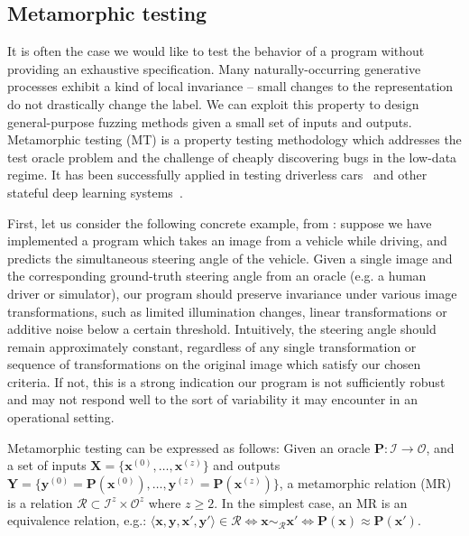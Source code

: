 \documentclass[12pt,initial,twoside,maitrise]{dms}
\numberwithin{equation}{section}
\numberwithin{table}{chapter}
\numberwithin{figure}{chapter}
\begin{document}
\subsection{Metamorphic testing}\label{subsec:metamorphic-testing}

It is often the case we would like to test the behavior of a program without providing an exhaustive specification. Many naturally-occurring generative processes exhibit a kind of local invariance -- small changes to the representation do not drastically change the label. We can exploit this property to design general-purpose fuzzing methods given a small set of inputs and outputs. Metamorphic testing (MT) is a property testing methodology which addresses the test oracle problem and the challenge of cheaply discovering bugs in the low-data regime. It has been successfully applied in testing driverless cars~\citep{zhou2019metamorphic, pei2017deepxplore, tian2018deeptest} and other stateful deep learning systems~\citep{du2018deepcruiser}.

First, let us consider the following concrete example, from \citet{tian2018deeptest}: suppose we have implemented a program which takes an image from a vehicle while driving, and predicts the simultaneous steering angle of the vehicle. Given a single image and the corresponding ground-truth steering angle from an oracle (e.g. a human driver or simulator), our program should preserve invariance under various image transformations, such as limited illumination changes, linear transformations or additive noise below a certain threshold. Intuitively, the steering angle should remain approximately constant, regardless of any single transformation or sequence of transformations on the original image which satisfy our chosen criteria. If not, this is a strong indication our program is not sufficiently robust and may not respond well to the sort of variability it may encounter in an operational setting.

Metamorphic testing can be expressed as follows: Given an oracle $\mathbf P: \mathcal I \rightarrow \mathcal O$, and a set of inputs $\mathbf X = \{\mathbf{x}^{(0)}, \dots, \mathbf{x}^{(z)}\}$ and outputs $\mathbf Y = \{\mathbf{y}^{(0)} = \mathbf{P}(\mathbf{x}^{(0)}), \dots, \mathbf{y}^{(z)} = \mathbf{P}(\mathbf{x}^{(z)})\}$, a metamorphic relation (MR) is a relation $\mathcal R \subset \mathcal I^z \times \mathcal O^z$ where $z \geq 2$. In the simplest case, an MR is an equivalence relation, e.g.: $\langle \mathbf x, \mathbf y, \mathbf x', \mathbf y' \rangle \in \mathcal R \Leftrightarrow \mathbf x \sim_{\mathcal R} \mathbf x' \Leftrightarrow \mathbf P(\mathbf x) \approx \mathbf P(\mathbf x')$.
\end{document}
